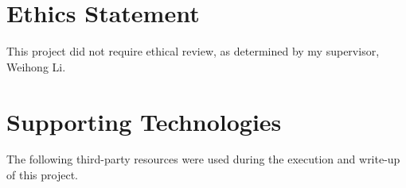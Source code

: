 \documentclass[
  oneside,
  author={Shijie Lu},
  degree={BSc},
  title={Label-Efficient Semantic Segmentation via Self-Supervised Depth Estimation and Cross-Task Consistency},
  unit={COMS30045},
  subtitle={}
]{dissertation}
\begin{document}
\tableofcontents
\listoffigures
\listoftables

\chapter*{Ethics Statement}

This project did not require ethical review, as determined by my
supervisor, Weihong Li.

\chapter*{Supporting Technologies}

\noindent
The following third-party resources were used during the execution and
write-up of this project.
\end{document}
